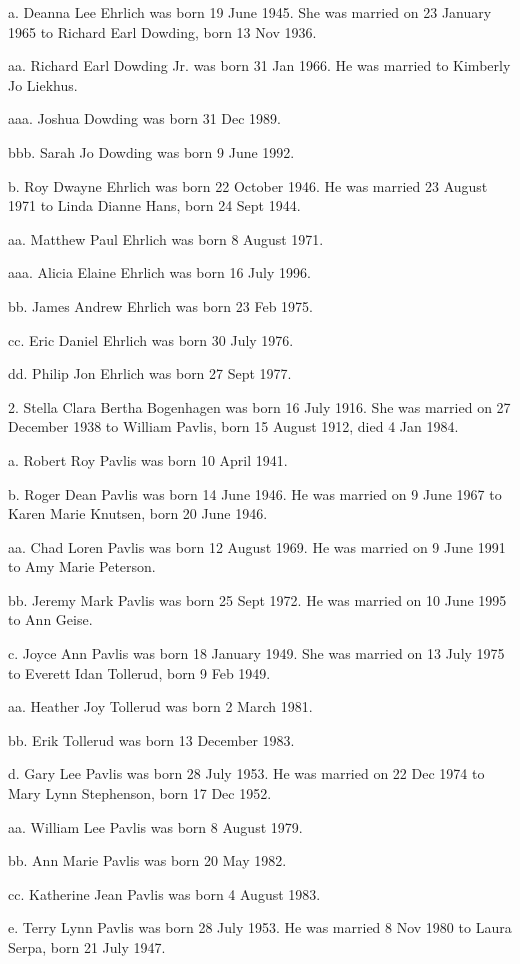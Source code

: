 \documentclass[a4paper]{article}
\begin{document}
a. Deanna Lee Ehrlich was born 19 June 1945.  She was married on 23 January 1965 to Richard Earl Dowding, born 13 Nov 1936.

aa. Richard Earl Dowding Jr. was born 31 Jan 1966. He was married to Kimberly Jo Liekhus.

aaa. Joshua Dowding was born 31 Dec 1989.

bbb. Sarah Jo Dowding was born 9 June 1992. 

b. Roy Dwayne Ehrlich was born 22 October 1946.  He was married 23 August 1971 to Linda Dianne Hans, born 24 Sept 1944.

aa. Matthew Paul Ehrlich was born 8 August 1971.

aaa. Alicia Elaine Ehrlich was born 16 July 1996.

bb. James Andrew Ehrlich was born 23 Feb 1975.

cc. Eric Daniel Ehrlich was born 30 July 1976.

dd. Philip Jon Ehrlich was born 27 Sept 1977.

2. Stella Clara Bertha Bogenhagen was born 16 July 1916.  She was married on 27 December 1938 to William Pavlis, born 15 August 1912, died 4 Jan 1984.

a. Robert Roy Pavlis was born 10 April 1941.

b. Roger Dean Pavlis was born 14 June 1946.  He was married on 9 June 1967 to Karen Marie Knutsen, born 20 June 1946.
 
aa. Chad Loren Pavlis was born 12 August 1969.  He was married on 9 June 1991 to Amy Marie Peterson.

bb. Jeremy Mark Pavlis was born 25 Sept 1972.  He was married on 10 June 1995 to Ann Geise.

c. Joyce Ann Pavlis was born 18 January 1949.  She was married on 13 July 1975 to Everett Idan Tollerud, born 9 Feb 1949.

aa. Heather Joy Tollerud was born 2 March 1981.

bb. Erik Tollerud was born 13 December 1983.  

d. Gary Lee Pavlis was born 28 July 1953.  He was married on 22 Dec 1974 to Mary Lynn Stephenson, born 17 Dec 1952.

aa. William Lee Pavlis was born 8 August 1979.

bb. Ann Marie Pavlis was born 20 May 1982.

cc. Katherine Jean Pavlis was born 4 August 1983.

e. Terry Lynn Pavlis was born 28 July 1953.  He was married 8 Nov 1980 to Laura Serpa, born 21 July 1947.
\end{document}
